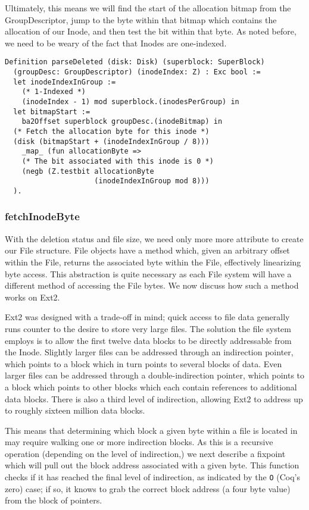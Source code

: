 \documentclass[nocopyrightspace]{sigplanconf}
\begin{document}
Ultimately, this means we will find the start of the allocation bitmap from
the GroupDescriptor, jump to the byte within that bitmap which contains the
allocation of our Inode, and then test the bit within that byte. As noted
before, we need to be weary of the fact that Inodes are one-indexed.


\begin{lstlisting}
Definition parseDeleted (disk: Disk) (superblock: SuperBlock)
  (groupDesc: GroupDescriptor) (inodeIndex: Z) : Exc bool :=
  let inodeIndexInGroup := 
    (* 1-Indexed *)
    (inodeIndex - 1) mod superblock.(inodesPerGroup) in
  let bitmapStart := 
    ba2Offset superblock groupDesc.(inodeBitmap) in
  (* Fetch the allocation byte for this inode *)
  (disk (bitmapStart + (inodeIndexInGroup / 8))) 
    _map_ (fun allocationByte =>
    (* The bit associated with this inode is 0 *)
    (negb (Z.testbit allocationByte 
                     (inodeIndexInGroup mod 8)))
  ).
\end{lstlisting}

\subsubsection{fetchInodeByte}
With the deletion status and file size, we need only more more attribute to
create our File structure. File objects have a method which, given an
arbitrary offset within the File, returns the associated byte within the File,
effectively linearizing byte access. This abstraction is quite necessary as
each File system will have a different method of accessing the File bytes. We
now discuss how such a method works on Ext2.

Ext2 was designed with a trade-off in mind; quick access to file data
generally runs counter to the desire to store very large files. The solution
the file system employs is to allow the first twelve data blocks to be
directly addressable from the Inode. Slightly larger files can be addressed
through an indirection pointer, which points to a block which in turn points
to several blocks of data. Even larger files can be addressed through a
double-indirection pointer, which points to a block which points to other
blocks which each contain references to additional data blocks. There is also
a third level of indirection, allowing Ext2 to address up to roughly sixteen
million data blocks.

This means that determining which block a given byte within a file is located
in may require walking one or more indirection blocks. As this is a recursive
operation (depending on the level of indirection,) we next describe a fixpoint
which will pull out the block address associated with a given byte. This
function checks if it has reached the final level of indirection, as indicated
by the {\tt O} (Coq's zero) case; if so, it knows to grab the correct block
address (a four byte value) from the block of pointers.
\end{document}
